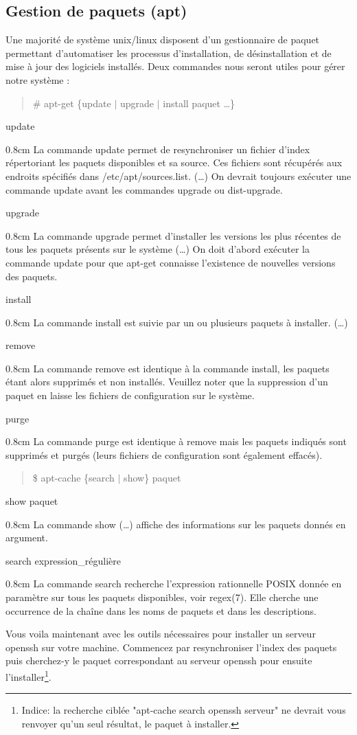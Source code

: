 \documentclass[a4paper,11pt]{article}
\newcommand{\commande}[1] {
    \begin{quote}
    \tt\raggedright #1 
    \end{quote}
}
\newcommand{\man}[2]{
    \begin{tcolorbox}[toprule=3mm,width=\textwidth,outer arc=0mm,colbacktitle=grayman,coltitle=black,colback={grayman},colframe={grayman},title={man : \tt #1}]
        \tt\raggedright #2
    \end{tcolorbox}
}
\newcommand{\mandesc}[1]{
    \begin{adjustwidth}{0.8cm}{}
        #1
    \end{adjustwidth}
}
\begin{document}
\subsection{Gestion de paquets (apt)}
\par Une majorité de système unix/linux disposent d'un gestionnaire de paquet permettant d'automatiser les processus d'installation, de désinstallation et de mise à jour des logiciels installés. Deux commandes nous seront utiles pour gérer notre système :
\commande{\# apt-get \{update $|$ upgrade $|$ install paquet \ldots\}}
\man{apt-get}{
update
\mandesc{La commande update permet de resynchroniser un fichier d'index répertoriant les paquets disponibles et sa source. Ces fichiers sont récupérés aux endroits spécifiés dans /etc/apt/sources.list. (\ldots) On devrait toujours exécuter une commande update avant les commandes upgrade ou dist-upgrade.}
upgrade
\mandesc{La commande upgrade permet d'installer les versions les plus récentes de tous les paquets présents sur le système (\dots) On doit d'abord exécuter la commande update pour que apt-get connaisse l'existence de nouvelles versions des paquets.}
install
\mandesc{La commande install est suivie par un ou plusieurs paquets à installer. (\ldots)}
remove
\mandesc{La commande remove est identique à la commande install, les paquets étant alors supprimés et non installés. Veuillez noter que la suppression d'un paquet en laisse les fichiers de configuration sur le système.}
purge
\mandesc{La commande purge est identique à remove mais les paquets indiqués sont supprimés et purgés (leurs fichiers de configuration sont également effacés).}
}
\commande{\$ apt-cache \{search $|$ show\} paquet}
\man{apt-cache}{
show paquet
\mandesc{La commande show (\dots) affiche des informations sur les paquets donnés en argument.}
search expression\_régulière
\mandesc{La commande search recherche l'expression rationnelle POSIX donnée en paramètre sur tous les paquets disponibles, voir regex(7). Elle cherche une occurrence de la chaîne dans les noms de paquets et dans les descriptions.}
}
\par Vous voila maintenant avec les outils nécessaires pour installer un serveur openssh sur votre machine. Commencez par resynchroniser l'index des paquets puis cherchez-y le paquet correspondant au serveur openssh pour ensuite l'installer\footnote{Indice: la recherche ciblée "apt-cache search openssh serveur" ne devrait vous renvoyer qu'un seul résultat, le paquet à installer.}.
\end{document}
